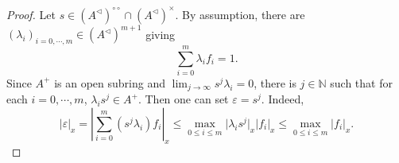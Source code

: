 \documentclass[10pt]{article}
\numberwithin{equation}{section}
\theoremstyle{definition}
\newcommand{\N}[0]{\mathbb{N}}
\newcommand{\ab}[1]{\vert #1 \vert}
\newcommand{\dcirc}[0]{{\circ\circ}}
\begin{document}
\begin{proof}
    Let $s\in (A^{\triangleleft})^\dcirc\cap (A^{\triangleleft})^\times$. By assumption, there are $(\lambda_i)_{i=0,\cdots,m}\in (A^\triangleleft)^{m+1}$ giving
    \begin{equation*}
        \sum_{i=0}^m \lambda_i f_i = 1.
    \end{equation*}
    Since $A^+$ is an open subring and $\lim_{j\to\infty} s^j\lambda_i = 0$, there is $j\in\N$ such that for each $i=0,\cdots,m$, $\lambda_is^j\in A^+$. Then one can set $\varepsilon = s^j$. Indeed,
    \begin{equation*}
        \ab{\varepsilon}_x =\left\vert\sum_{i=0}^m (s^j\lambda_i)f_i\right\vert_x\leq\max_{0\leq i\leq m}\ab{\lambda_is^j}_x\ab{f_i}_x\leq \max_{0\leq i\leq m}\ab{f_i}_x.
    \end{equation*}
\end{proof}
\end{document}
